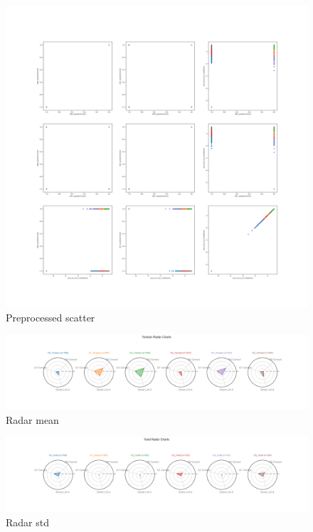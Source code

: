 \documentclass{article}
\begin{document}
\begin{figure}[H]
    \centering
    \includegraphics[width=1\columnwidth]{Crystal/feedback_logtransform_zNonepca2k6/Preprocessed Scatter.png}
    \caption{Preprocessed scatter}
    \label{fig:Crystalfeedbackpreprocessedscatter}
\end{figure}
\begin{figure}[H]
    \centering
    \includegraphics[width=1\columnwidth]{Crystal/feedback_logtransform_zNonepca2k6/radar_mean.png}
    \caption{Radar mean}
    \label{fig:Crystalfeedbackradarmean}
\end{figure}
\begin{figure}[H]
    \centering
    \includegraphics[width=1\columnwidth]{Crystal/feedback_logtransform_zNonepca2k6/radar_std.png}
    \caption{Radar std}
    \label{fig:Crystalfeedbackradarstd}
\end{figure}
\end{document}
